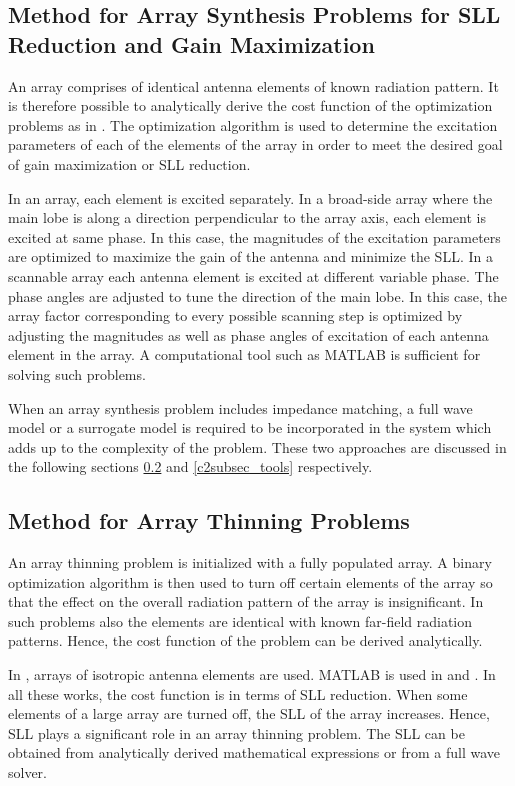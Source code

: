 \subsection{Method for Array Synthesis Problems for SLL Reduction and Gain Maximization} \label{c2subsec_sll_methods}
An array comprises of identical antenna elements of known radiation pattern. It is therefore possible to analytically derive the cost function of the optimization problems as in \cite{arraySynth2, arraySynth3, arraySynth4, compCAD4Arry}. The optimization algorithm is used to determine the excitation parameters of each of the elements of the array in order to meet the desired goal of gain maximization or SLL reduction.

In an array, each element is excited separately. In a broad-side array where the main lobe is along a direction perpendicular to the array axis, each element is excited at same phase. In this case, the magnitudes of the excitation parameters are optimized to maximize the gain of the antenna and minimize the SLL. In a scannable array each antenna element is excited at different variable phase. The phase angles are adjusted to tune the direction of the main lobe. In this case, the array factor corresponding to every possible scanning step is optimized by adjusting the magnitudes as well as phase angles of excitation of each antenna element in the array. A computational tool such as MATLAB is sufficient for solving such problems.

When an array synthesis problem includes impedance matching, a full wave model or a surrogate model is required to be incorporated in the system which adds up to the complexity of the problem. These two approaches are discussed in the following sections \ref{c2subsec_thinning} and \ref{c2subsec_tools} respectively.

\subsection{Method for Array Thinning Problems} \label{c2subsec_thinning}
An array thinning problem is initialized with a fully populated array. A binary optimization algorithm is then used to turn off certain elements of the array so that the effect on the overall radiation pattern of the array is insignificant. In such problems also the elements are identical with known far-field radiation patterns. Hence, the cost function of the problem can be derived analytically.

In \cite{arrayThin1, arrayThin2, arrayThin3}, arrays of isotropic antenna elements are used. MATLAB is used in \cite{arrayThin2} and \cite{arrayThin3}. In all these works, the cost function is in terms of SLL reduction. When some elements of a large array are turned off, the SLL of the array increases. Hence, SLL plays a significant role in an array thinning problem. The SLL can be obtained from analytically derived mathematical expressions or from a full wave solver.

